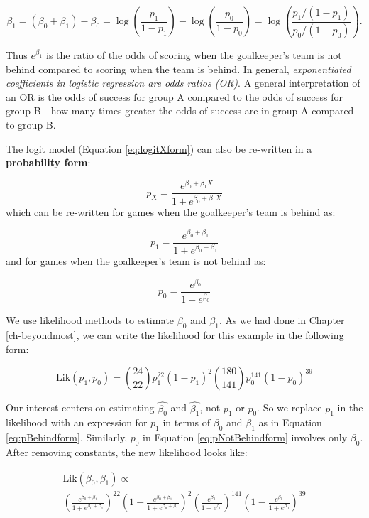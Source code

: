 \documentclass[
]{krantz}
\newcommand{\Lik}{\mathrm{Lik}}
\begin{document}
\begin{equation*}
\beta_1 = (\beta_0 + \beta_1) - \beta_0 = 
\log\left(\frac{p_1}{1-p_1}\right) - \log\left(\frac{p_0}{1-p_0}\right) =
\log\left(\frac{p_1/(1-p_1)}{p_0/{(1-p_0)}}\right).
\end{equation*}

Thus \(e^{\beta_1}\) is the ratio of the odds of scoring when the goalkeeper's team is not behind compared to scoring when the team is behind. In general, \emph{exponentiated coefficients in logistic regression are odds ratios (OR)}. A general interpretation of an OR is the odds of success for group A compared to the odds of success for group B---how many times greater the odds of success are in group A compared to group B.

The logit model (Equation \eqref{eq:logitXform}) can also be re-written in a \textbf{probability form}:

\begin{equation*} 
p_X=\frac{e^{\beta_0+\beta_1X}}{1+e^{\beta_0+\beta_1X}}
\end{equation*}
which can be re-written for games when the goalkeeper's team is behind as:

\begin{equation} 
p_1=\frac{e^{\beta_0+\beta_1}}{1+e^{\beta_0+\beta_1}}  
\label{eq:pBehindform}
\end{equation}
and for games when the goalkeeper's team is not behind as:

\begin{equation} 
p_0=\frac{e^{\beta_0}}{1+e^{\beta_0}}
\label{eq:pNotBehindform}
\end{equation}

We use likelihood methods to estimate \(\beta_0\) and \(\beta_1\). As we had done in Chapter \ref{ch-beyondmost}, we can write the likelihood for this example in the following form:

\[\Lik(p_1, p_0) = {24 \choose 22}p_1^{22}(1-p_1)^{2}
{180 \choose 141}p_0^{141}(1-p_0)^{39}\]

Our interest centers on estimating \(\hat{\beta_0}\) and \(\hat{\beta_1}\), not \(p_1\) or \(p_0\). So we replace \(p_1\) in the likelihood with an expression for \(p_1\) in terms of \(\beta_0\) and \(\beta_1\) as in Equation \eqref{eq:pBehindform}. Similarly, \(p_0\) in Equation \eqref{eq:pNotBehindform} involves only \(\beta_0\). After removing constants, the new likelihood looks like:

\begin{equation*}
\begin{gathered}
    \Lik(\beta_0,\beta_1) \propto \\
    \left( \frac{e^{\beta_0+\beta_1}}{1+e^{\beta_0+\beta_1}}\right)^{22}\left(1- \frac{e^{\beta_0+\beta_1}}{1+e^{\beta_0+\beta_1}}\right)^{2}
    \left(\frac{e^{\beta_0}}{1+e^{\beta_0}}\right)^{141}\left(1-\frac{e^{\beta_0}}{1+e^{\beta_0}}\right)^{39}
\end{gathered}
\end{equation*}
\end{document}
